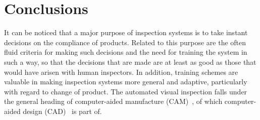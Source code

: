 \documentclass[10pt,twocolumn,letterpaper]{article}
\begin{document}
\section{Conclusions}
 It can be noticed that a major purpose of inspection systems is to take instant decisions on the compliance of products. Related to this purpose are the often fluid criteria for making such decisions and the need for training the system in such a way, so that the decisions that are made are at least as good as those that would have arisen with human inspectors. In addition, training schemes are valuable in making inspection systems more general and adaptive, particularly with regard to change of product. The automated visual inspection falls under the general heading of computer-aided manufacture (CAM)~\cite{aldinger1983computer}, of which computer-aided design (CAD)~\cite{renner2003genetic} is part of.
{\small


}
\end{document}
